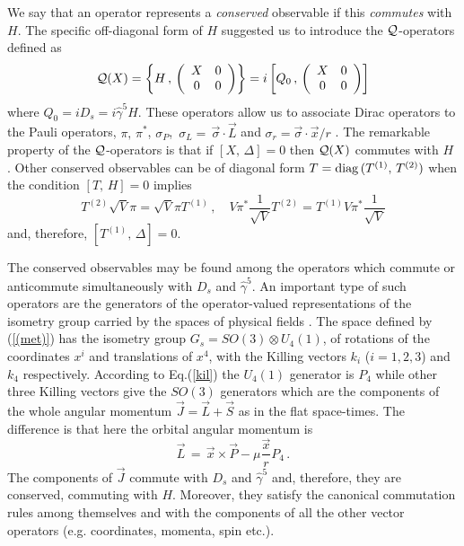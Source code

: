 \documentclass[a4paper,12pt]{article}
\begin{document}
We say that an operator represents a {\em conserved} observable if 
this {\em commutes} with $H$. 
The specific off-diagonal form of $H$ suggested us to introduce the 
${\cal Q}$-operators defined as \cite{CV2}
\begin{equation}
{\cal Q}(X)=\left\{ H\,,\,\left(
\begin{array}{cc}
X&0\\
0&0
\end{array} 
\right) \right\}
=i\left[ Q_{0}\,,\,\left(
\begin{array}{cc}
X&0\\
0&0
\end{array} 
\right) \right] 
\end{equation}
where $Q_0=i{D}_s=i\hat\gamma^{5}H$. These operators  
allow us to associate Dirac operators to the Pauli operators, 
$\pi,\,\pi^{*}$, $\sigma_{P}$, \,$\sigma_{L}=\,\vec{\sigma}\cdot\vec{L}$ and 
$\sigma_{r}=\vec{\sigma}\cdot\vec{x}/r$ \cite{DYON}.
The remarkable property of the ${\cal Q}$-operators is that if 
$[X,\,\Delta]=0$ then ${\cal Q}(X)$ commutes with $H$ \cite{CV2}. 
Other conserved observables can be of diagonal form  
$T={\rm diag}\,(T^{(1)},\,T^{(2)})$  when the condition 
$[T,\,H]=0$ implies   
\begin{equation}\label{T12}
T^{(2)}\sqrt{V}\pi=\sqrt{V} \pi T^{(1)}
\,,\quad V\pi^{*}\frac{1}{\sqrt{V}}T^{(2)}=
T^{(1)}V\pi^{*}\frac{1}{\sqrt{V}}
\end{equation}
and, therefore,  $[T^{(1)},\,\Delta]=0$. 


The conserved observables may be found among the operators 
which commute or anticommute  simultaneously with $D_s$  and $\hat\gamma^5$. 
An important type of such operators are the generators of the 
operator-valued representations of the isometry group carried by the spaces 
of physical fields \cite{CML,ES}. The space defined by (\ref{(met)}) has  
the isometry group $G_{s}=SO(3)\otimes U_{4}(1)$, 
of rotations of the coordinates $x^i$  and translations of $x^{4}$,
with the Killing vectors $k_i$ ($i=1,2,3$) and $k_4$ respectively.
According to Eq.(\ref{kil}) the $U_{4}(1)$ generator is $P_{4}$  
while other three Killing vectors  give the 
$SO(3)$ generators which are the components of the whole angular momentum 
$\vec{J} =\vec{L} + \vec{S}$  as in the flat space-times. The difference 
is that here the orbital angular momentum is  
\begin{equation}\label{(angmom)}
\vec{L}\,=\,\vec{x}\times\vec{P}-\mu\frac{\vec{x}}{r}P_{4}\,.
\end{equation} 
The components of $\vec{J}$ commute with ${D}_s$ and 
$\hat\gamma^5$ and, therefore, they are conserved, commuting with $H$.   
Moreover, they  satisfy the canonical commutation rules 
among themselves and with the components of all the other vector operators 
(e.g. coordinates,  momenta, spin etc.). 
\end{document}
